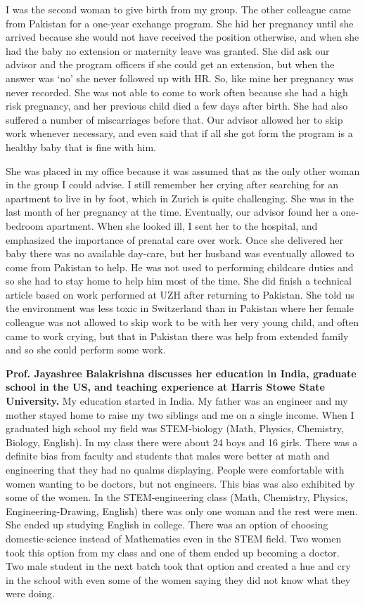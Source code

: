 \documentclass[utf8]{frontiersSCNS} %
\begin{document}
I was the second woman to give birth from my group. The other colleague came from Pakistan for a one-year exchange program. She hid her pregnancy until she arrived because she would not have received the position otherwise, and when she had the baby no extension or maternity leave was granted.  She did ask our advisor and the program officers if she could get an extension, but when the answer was `no' she never followed up with HR. So, like mine her pregnancy was never recorded. She was not able to come to work often because she had a high risk pregnancy, and her previous child died a few days after birth. She had also suffered a number of miscarriages before that. Our advisor allowed her to skip work whenever necessary, and even said that if all she got form the program is a healthy baby that is fine with him. 

She was placed in my office because it was assumed that as the only other woman in the group I could advise. I still remember her crying after searching for an apartment to live in by foot, which in Zurich is quite challenging.  She was in the last month of her pregnancy at the time. Eventually, our advisor found her a one-bedroom apartment. When she looked ill, I sent her to the hospital, and emphasized the importance of prenatal care over work. Once she delivered her baby there was no available day-care, but her husband was eventually allowed to come from Pakistan to help. He was not used to performing childcare duties and so she had to stay home to help him most of the time. She did finish a technical article based on work performed at UZH after returning to Pakistan. She told us the environment was less toxic in Switzerland than in Pakistan where her female colleague was not allowed to skip work to be with her very young child, and often came to work crying, but that in Pakistan there was help from extended family and so she could perform some work.

{\bf Prof. Jayashree Balakrishna discusses her education in India, graduate school in the US, and teaching experience at Harris Stowe State University.}
My education started in India. My father was an engineer and my mother stayed home to raise my two siblings and me on a single income. When I graduated high school my field was STEM-biology (Math, Physics, Chemistry, Biology, English).  In my class there were about 24 boys and 16 girls. There was a definite bias from faculty and students that males were better at math and engineering that they had no qualms displaying. People were comfortable with women wanting to be doctors, but not engineers. This bias was also exhibited by some of the women. In the STEM-engineering class (Math, Chemistry, Physics, Engineering-Drawing, English) there was only one woman and the rest were men. She ended up studying English in college. There was an option of choosing domestic-science instead of Mathematics even in the STEM field. Two women took this option from my class and one of them ended up becoming a doctor. Two male student in the next batch took that option and created a hue and cry in the school with even some of the women saying they did not know what they were doing.  
\end{document}
